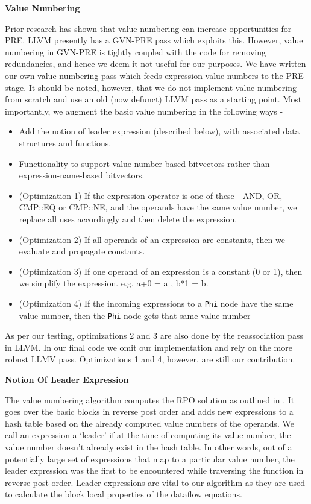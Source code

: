 \begin{flushleft}
\textbf{\Large{Value Numbering}}
\end{flushleft}
Prior research has shown that value numbering can increase opportunities for PRE.
LLVM presently has a GVN-PRE pass which exploits this. However, value numbering in 
GVN-PRE is tightly coupled with the code for removing redundancies, and hence
we deem it not useful for our purposes. We have written our own value numbering
pass which feeds expression value numbers to the PRE stage. It should be noted,
     however, that we do not implement value numbering from scratch and use an
     old (now defunct) LLVM pass as a starting point. Most importantly, we
     augment the basic value numbering in the following ways - 
     
\begin{itemize}     
  \item Add the notion of leader expression (described below), with associated
  data structures and functions. 
  \item Functionality to support value-number-based bitvectors rather than
  expression-name-based bitvectors. 
  \item (Optimization 1) If the expression operator is one of these - AND, OR, CMP::EQ
  or CMP::NE, and the operands have the same value number, we replace all uses
  accordingly and then delete the expression.
  \item (Optimization 2) If all operands of an expression are constants, then we 
  evaluate and propagate constants. 
  \item (Optimization 3) If one operand of an expression is a constant (0 or 1), then 
  we simplify the expression. e.g. {a+0 = a} , {b*1 = b}.
  \item (Optimization 4) If the incoming expressions to a \texttt{Phi} node have the same value 
  number, then the \texttt{Phi} node gets that same value number
\end{itemize}  
  As per our testing, optimizations 2 and 3 are also done by the reassociation
  pass in LLVM. In our final code we omit our implementation and rely on the
  more robust LLMV pass. Optimizations 1 and 4, however, are still our contribution.

\begin{flushleft}
\textbf{\large{Notion Of Leader Expression}}
\end{flushleft}
The value numbering algorithm computes the RPO solution as outlined in
\cite{Cooper95scc-basedvalue}. It goes over the basic blocks in reverse post
order and adds new expressions to a hash table based on the already computed
value numbers of the operands. We call an expression a `leader' if at the time
of computing its value number, the value number doesn't already exist in the
hash table. In other words, out of a potentially large set of expressions that
map to a particular value number, the leader expression was the first to be
encountered while traversing the function in reverse post order. Leader
expressions are vital to our algorithm as they are used to calculate the block
local properties of the dataflow equations.
